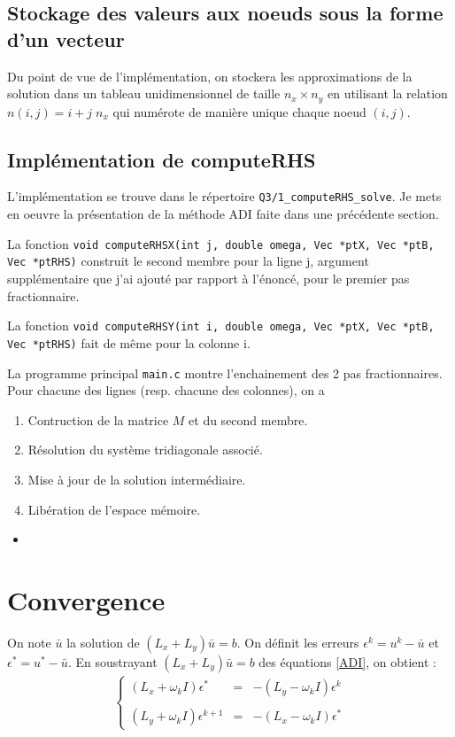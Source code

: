 \documentclass{article}
\newcommand{\cscript}[2]
  {\begin{itemize}\item[]\end{itemize}}
\begin{document}
\subsection{Stockage des valeurs aux noeuds sous la forme d'un vecteur}



Du point de vue de l'implémentation, on stockera les approximations de la solution dans un tableau unidimensionnel 
de taille $n_x \times n_y$ en utilisant la relation $n(i,j)=i+j\; n_x$ qui numérote de manière unique chaque noeud $(i,j)$. 

\subsection{Implémentation de computeRHS}

L'implémentation se trouve dans le répertoire {\tt Q3/1\_computeRHS\_solve}. 
Je mets en oeuvre la présentation de la méthode ADI faite dans une précédente section.

La fonction {\tt void computeRHSX(int j, double omega, Vec *ptX, Vec *ptB, Vec *ptRHS)} construit
le second membre pour la ligne j, argument supplémentaire que j'ai ajouté par rapport à l'énoncé,
pour le premier pas fractionnaire.

La fonction {\tt void computeRHSY(int i, double omega, Vec *ptX, Vec *ptB, Vec *ptRHS)} fait de même
pour la colonne i.

La programme principal {\tt main.c} montre l'enchainement  des 2 pas fractionnaires.
Pour chacune des lignes (resp. chacune des colonnes), on a 
\begin{enumerate}
\item Contruction de la matrice $M$ et du second membre.
\item Résolution du système tridiagonale associé.
\item Mise à jour de la solution intermédiaire.
\item Libération de l'espace mémoire.
\end{enumerate}

\cscript{computeRHS\_main}{Appel des fonctions computeRHSX et computeRHSY }

 \section{Convergence}
    
On note $\bar u$ la solution de $(L_x+L_y) \bar u =b$. On définit les erreurs $\epsilon^k = u^k-\bar u$ et
$\epsilon^{*}= u^{*}-\bar u$.  En soustrayant $(L_x+L_y) \bar u =b$ des équations \eqref{ADI},
on obtient :
 \begin{eqnarray}\left\{ 
\begin{array}{lcl}
  (L_x+\omega_k I) \epsilon^{*} &=& -(L_y-\omega_k I) \epsilon^k \\
  \\
 (L_y+\omega_k I) \epsilon^{k+1} &=& -(L_x-\omega_k I) \epsilon^{*}  \end{array}  \right. 
  \label{err}
  \end{eqnarray}
 
\end{document}
